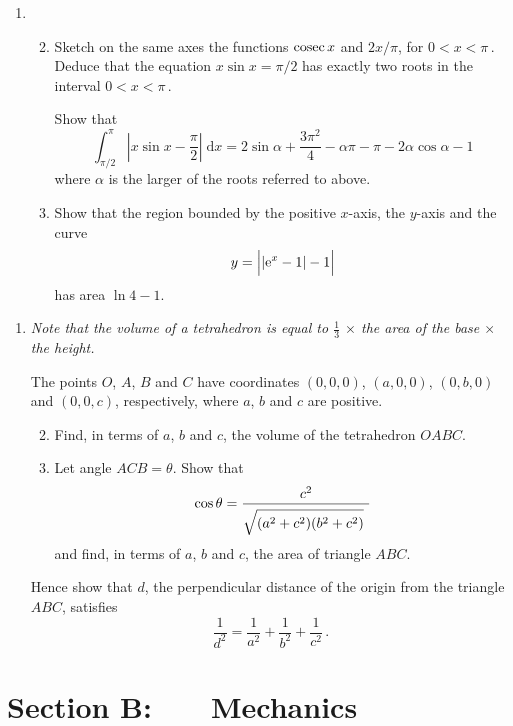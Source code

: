 \documentclass[a4, 11pt]{report}
\newlength{\qspace}
\newcounter{qnumber}
\newenvironment{question}%
 {\vspace{\qspace}
  \begin{enumerate}[\bfseries 1\quad][10]%
    \setcounter{enumi}{\value{qnumber}}%
    \item%
 }
{
  \end{enumerate}
  \filbreak
  \stepcounter{qnumber}
 }
\newenvironment{questionparts}[1][1]%
 {
  \begin{enumerate}[\bfseries (i)]%
    \setcounter{enumii}{#1}
    \addtocounter{enumii}{-1}
    \setlength{\itemsep}{5mm}
    \setlength{\parskip}{8pt}
 }
 {
  \end{enumerate}
 }
\def\e{{\mathrm e}}
\begin{document}
\begin{question}
\begin{questionparts}
\item Sketch on the same axes the functions 
${\rm cosec}\, x$ and $2x/ \pi$, for 
$0<x<\pi\,$. Deduce that the equation $x\sin x = \pi/2 $ has exactly
two roots in the interval  $0<x<\pi\,$.

Show that 
\[
\displaystyle \int_{\pi/2}^{\pi} \left \vert x\sin x  - 
\frac{\pi} { 2} \right \vert \; \mathrm{d}x 
= 
2\sin\alpha   +\frac{3\pi^2} 4 - \alpha \pi -\pi -2\alpha
\cos\alpha -1
\]
where $\alpha$ is the larger of the roots referred to above.


\item Show that the  region bounded by the positive $x$-axis, the $y$-axis
  and the curve
\[y = \Bigl| \vert \e^x - 1 \vert - 1 \Bigr|\] 
has area $\ln 4-1$.
\end{questionparts}
\end{question}
		
\begin{question}	
{\it Note that the volume of a 
tetrahedron is equal to  $\frac1  3$ $\times$ 
the area of the base $\times$ the height.}

The points $O$, $A$, $B$ and $C$ have coordinates $(0,0,0)$, $(a,0,0)$, $(0,b,0)$
and $(0,0,c)$, respectively, where $a$, $b$ and $c$ are positive.
\begin{questionparts}
\item Find, in terms of $a$, $b$ and $c$,  the volume of the tetrahedron
  $OABC$.
\item
 Let angle $ACB = \theta$. Show that
\[
\cos\theta = 
\frac {c^2}
{ 
{ \sqrt{\vphantom{ \dot b}
(a^2+c^2)(b^2+c^2)} }
^{\vphantom A}    
\  }
\]
and find, in terms of $a$, $b$ and $c$, the  area of triangle $ABC$.
\end{questionparts}

Hence show that $d$,  the perpendicular distance of the origin from
the  triangle $ABC$, satisfies
\[
\frac 1{d^2} = \frac 1 {a^2} + \frac 1 {b^2} + \frac 1 {c^2} \,.
\]
\end{question}	
		

		
	
\newpage
\section*{Section B: \ \ \ Mechanics}
\end{document}
